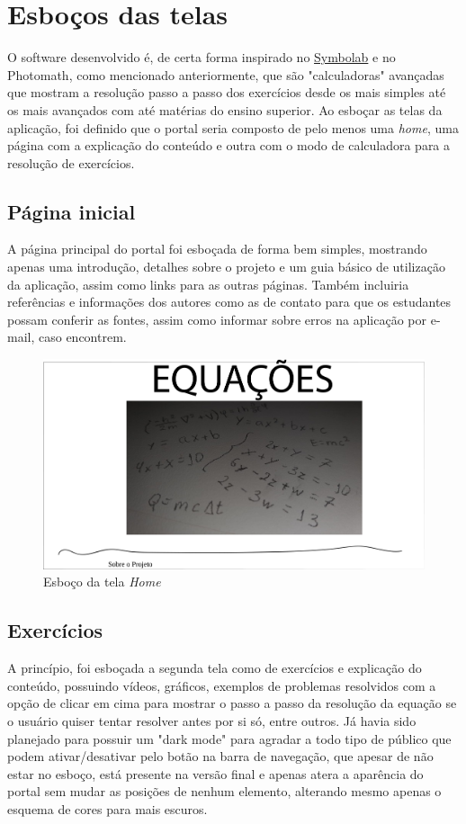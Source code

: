 \documentclass[12pt]{report}
\begin{document}
\chapter{Esboços das telas}
O software desenvolvido é, de certa forma inspirado no \href{https://pt.symbolab.com/}{Symbolab} e no Photomath, como mencionado anteriormente, que são "calculadoras" avançadas que mostram a resolução passo a passo dos exercícios desde os mais simples até os mais avançados com até matérias do ensino superior. Ao esboçar as telas da aplicação, foi definido que o portal seria composto de pelo menos uma \textit{home}, uma página com a explicação do conteúdo e outra com o modo de calculadora para a resolução de exercícios.

\section{Página inicial}
A página principal do portal foi esboçada de forma bem simples, mostrando apenas uma introdução, detalhes sobre o projeto e um guia básico de utilização da aplicação, assim como links para as outras páginas. Também incluiria referências e informações dos autores como as de contato para que os estudantes possam conferir as fontes, assim como informar sobre erros na aplicação por e-mail, caso encontrem.

\begin{figure}[H]
    \includegraphics[width=1\textwidth]{img/c.png}
    \caption{Esboço da tela \textit{Home}}
\end{figure}

\section{Exercícios}
A princípio, foi esboçada a segunda tela como de exercícios e explicação do conteúdo, possuindo vídeos, gráficos, exemplos de problemas resolvidos com a opção de clicar em cima para mostrar o passo a passo da resolução da equação se o usuário quiser tentar resolver antes por si só, entre outros. Já havia sido planejado para possuir um "dark mode" para agradar a todo tipo de público que podem ativar/desativar pelo botão na barra de navegação, que apesar de não estar no esboço, está presente na versão final e apenas atera a aparência do portal sem mudar as posições de nenhum elemento, alterando mesmo apenas o esquema de cores para mais escuros.
\end{document}
